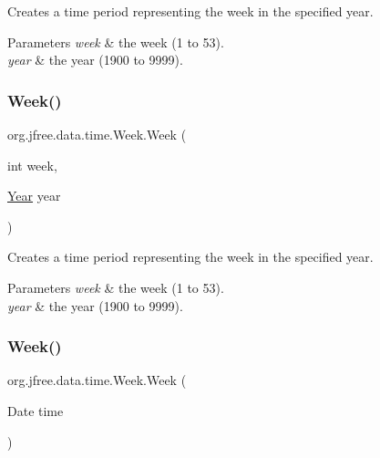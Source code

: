 Creates a time period representing the week in the specified year.


\begin{DoxyParams}{Parameters}
{\em week} & the week (1 to 53). \\
\hline
{\em year} & the year (1900 to 9999). \\
\hline
\end{DoxyParams}
\mbox{\label{classorg_1_1jfree_1_1data_1_1time_1_1_week_a7f4a22e7f8808dbd9441d8c02baf138c}} 
\subsubsection{\texorpdfstring{Week()}{Week()}\hspace{0.1cm}{\footnotesize\ttfamily [3/6]}}
{\footnotesize\ttfamily org.\+jfree.\+data.\+time.\+Week.\+Week (\begin{DoxyParamCaption}\item[{int}]{week,  }\item[{\mbox{\hyperlink{classorg_1_1jfree_1_1data_1_1time_1_1_year}{Year}}}]{year }\end{DoxyParamCaption})}

Creates a time period representing the week in the specified year.


\begin{DoxyParams}{Parameters}
{\em week} & the week (1 to 53). \\
\hline
{\em year} & the year (1900 to 9999). \\
\hline
\end{DoxyParams}
\mbox{\label{classorg_1_1jfree_1_1data_1_1time_1_1_week_aa828d1c01356acd1a042e0f8f06519ba}} 
\subsubsection{\texorpdfstring{Week()}{Week()}\hspace{0.1cm}{\footnotesize\ttfamily [4/6]}}
{\footnotesize\ttfamily org.\+jfree.\+data.\+time.\+Week.\+Week (\begin{DoxyParamCaption}\item[{Date}]{time }\end{DoxyParamCaption})}

